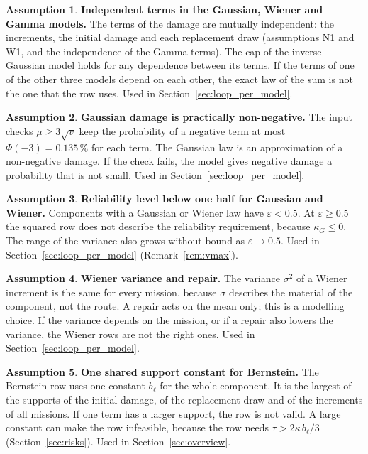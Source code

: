 \documentclass[11pt,a4paper]{article}
\theoremstyle{plain}
\theoremstyle{definition}
\newtheorem{assumption}{Assumption}
\theoremstyle{remark}
\begin{document}
\begin{assumption}\label{as:independent_terms}
\textbf{Independent terms in the Gaussian, Wiener and Gamma models.}
The terms of the damage are mutually independent: the increments, the initial damage and each replacement draw (assumptions N1 and W1, and the independence of the Gamma terms).
The cap of the inverse Gaussian model holds for any dependence between its terms.
If the terms of one of the other three models depend on each other, the exact law of the sum is not the one that the row uses.
Used in Section~\ref{sec:loop_per_model}.
\end{assumption}

\begin{assumption}\label{as:gaussian_positive}
\textbf{Gaussian damage is practically non-negative.}
The input checks $\mu \ge 3\sqrt{v}$ keep the probability of a negative term at most $\Phi(-3) = 0.135\,\%$ for each term.
The Gaussian law is an approximation of a non-negative damage.
If the check fails, the model gives negative damage a probability that is not small.
Used in Section~\ref{sec:loop_per_model}.
\end{assumption}

\begin{assumption}\label{as:epsilon_half}
\textbf{Reliability level below one half for Gaussian and Wiener.}
Components with a Gaussian or Wiener law have $\varepsilon < 0.5$.
At $\varepsilon \ge 0.5$ the squared row does not describe the reliability requirement, because $\kappa_G \le 0$.
The range of the variance also grows without bound as $\varepsilon \to 0.5$.
Used in Section~\ref{sec:loop_per_model} (Remark~\ref{rem:vmax}).
\end{assumption}

\begin{assumption}\label{as:wiener}
\textbf{Wiener variance and repair.}
The variance $\sigma^2$ of a Wiener increment is the same for every mission, because $\sigma$ describes the material of the component, not the route.
A repair acts on the mean only; this is a modelling choice.
If the variance depends on the mission, or if a repair also lowers the variance, the Wiener rows are not the right ones.
Used in Section~\ref{sec:loop_per_model}.
\end{assumption}

\begin{assumption}\label{as:bernstein_support}
\textbf{One shared support constant for Bernstein.}
The Bernstein row uses one constant $b_\ell$ for the whole component.
It is the largest of the supports of the initial damage, of the replacement draw and of the increments of all missions.
If one term has a larger support, the row is not valid.
A large constant can make the row infeasible, because the row needs $\tau > 2\kappa\, b_\ell/3$ (Section~\ref{sec:risks}).
Used in Section~\ref{sec:overview}.
\end{assumption}
\end{document}
